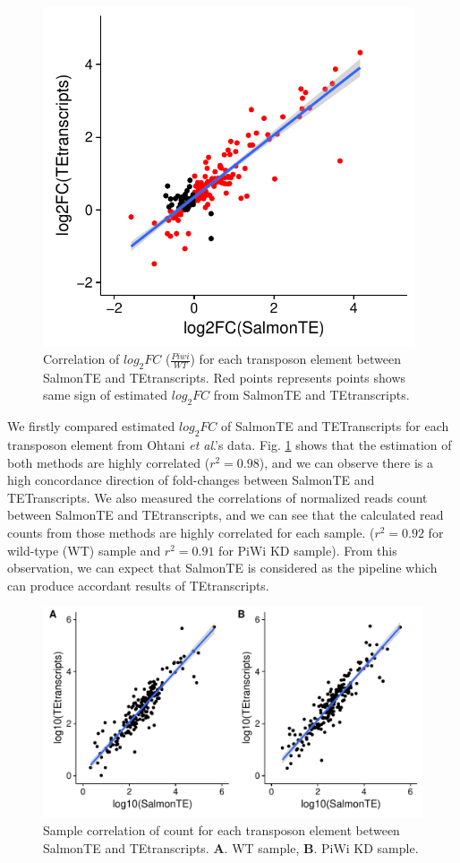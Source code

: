 \documentclass{ws-procs11x85}
\newcommand{\etal}{\textit{et al}.}
\begin{document}
\begin{figure}[h]
\centerline{
\includegraphics[width=11cm]{figure_corr_FC}
}
\caption{Correlation of $log_{2}FC$ ($\frac{Piwi}{WT}$) for each transposon element between SalmonTE and TEtranscripts. Red points represents points shows same sign of estimated $log_{2}FC$ from SalmonTE and TEtranscripts.}
\label{aba:fig2}
\end{figure}

We firstly compared estimated $log_{2}FC$ of SalmonTE and TETranscripts for each transposon element from Ohtani \etal's data. 
Fig. \ref{aba:fig2} shows that the estimation of both methods are highly correlated ($r^{2}=0.98$), and we can observe there is a high concordance direction of fold-changes between SalmonTE and TETranscripts. We also measured the correlations of normalized reads count between SalmonTE and TEtranscripts, 
and we can see that the calculated read counts from those methods are highly correlated for each sample. ($r^2=0.92$ for wild-type (WT) sample and $r^2=0.91$ for PiWi KD sample).
From this observation, we can expect that SalmonTE is considered as the pipeline which can produce accordant results of TEtranscripts.

\begin{figure}[h]
\centerline{
\includegraphics[width=13cm]{figure_corr_count}
}
\caption{Sample correlation of count for each transposon element between SalmonTE and TEtranscripts. \textbf{A}. WT sample, \textbf{B}. PiWi KD sample.}
\label{aba:fig3}
\end{figure}
\end{document}
